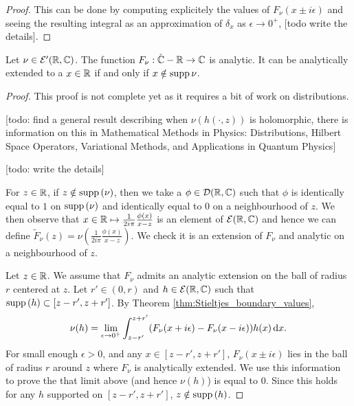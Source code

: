 \begin{proof}
  This can be done by computing explicitely the values of $F_\nu(x \pm i \epsilon)$
  and seeing the resulting integral as an approximation of $\delta_x$ as $\epsilon \rightarrow 0^+$,
  [todo write the details].
\end{proof}

\begin{theorem}
  \label{thm:Stieltjes_holomorphic}
  \notready
  Let $\nu \in \mathcal{E}'(\mathbb{R}, \mathbb{C})$.
  The function $F_\nu : \hat{\mathbb{C}} - \mathbb{R} \rightarrow \mathbb{C}$ is analytic.
  It can be analytically extended to a $x \in \mathbb{R}$ if and only if $x \notin \mathrm{supp} \, \nu$.
\end{theorem}

\begin{proof}
  This proof is not complete yet as it requires a bit of work on distributions.

  [todo: find a general result describing when $\nu(h(\cdot, z))$ is holomorphic, there is
  information on this in Mathematical Methods in Physics: Distributions, Hilbert Space Operators,
  Variational Methods, and Applications in Quantum Physics]

  [todo: write the details]

  For $z \in \mathbb{R}$, if $z \notin \mathrm{supp} \,(\nu)$, then we take a
  $\phi \in \mathcal{D}(\mathbb{R}, \mathbb{C})$ such that $\phi$ is identically equal to $1$ on $\mathrm{supp} \, (\nu)$
  and identically equal to $0$ on a neighbourhood of $z$.
  We then observe that $x \in \mathbb{R} \mapsto  \frac{1}{2 i \pi} \frac{\phi(x)}{x-z}$
  is an element of $\mathcal{E}(\mathbb{R}, \mathbb{C})$ and hence we can
  define $\tilde{F}_\nu(z) = \nu(\frac{1}{2 i \pi} \frac{\phi(x)}{x-z})$.
  We check it is an extension of $F_\nu$ and analytic on a neighbourhood of $z$.

  Let $z \in \mathbb{R}$. We assume that $F_\nu$ admits an analytic extension on the ball of radius $r$
  centered at $z$.
  Let $r' \in (0,r)$ and
  $h \in \mathcal{E}(\mathbb{R}, \mathbb{C})$ such that $\mathrm{supp} \,(h) \subset [z-r',z+r']$.
  By Theorem \ref{thm:Stieltjes_boundary_values},
  \begin{equation*}
    \nu(h) = \lim_{\epsilon \rightarrow 0^+}
    \int_{z-r'}^{z+r'} (F_\nu(x+i \epsilon) - F_\nu(x - i \epsilon)) h(x) \, \mathrm{d} x.
  \end{equation*}
  For small enough $\epsilon>0$, and any $x \in [z-r',z+r']$,
  $F_\nu(x \pm i \epsilon)$ lies in the ball of radius $r$ around $z$ where $F_\nu$
  is analytically extended. We use this information to prove the that limit above (and hence
  $\nu(h)$) is equal to $0$. Since this holds for any $h$ supported on $[z-r',z+r']$,
  $z \notin \mathrm{supp} \,(h)$.
\end{proof}

